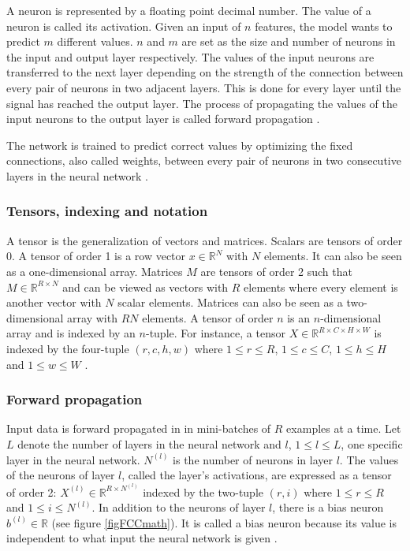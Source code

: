 \documentclass[a4paper, twoside]{article}
\begin{document}
A neuron is represented by a floating point decimal number. The value of a neuron is called its activation. Given an input of $n$ features, the model wants to predict $m$ different values. $n$ and $m$ are set as the size and number of neurons in the input and output layer respectively. The values of the input neurons are transferred to the next layer depending on the strength of the connection between every pair of neurons in two adjacent layers. This is done for every layer until the signal has reached the output layer. The process of propagating the values of the input neurons to the output layer is called forward propagation \cite{cs231n}.

The network is trained to predict correct values by optimizing the fixed connections, also called weights, between every pair of neurons in two consecutive layers in the neural network \cite{cs231n}.

\subsubsection{Tensors, indexing and notation}
A tensor is the generalization of vectors and matrices. Scalars are tensors of order 0. A tensor of order 1 is a row vector $x \in \mathbb{R}^N$ with $N$ elements. It can also be seen as a one-dimensional array. Matrices $M$ are tensors of order 2 such that $M \in \mathbb{R}^{R \times N}$ and can be viewed as vectors with $R$ elements where every element is another vector with $N$ scalar elements. Matrices can also be seen as a two-dimensional array with $RN$ elements. A tensor of order $n$ is an $n$-dimensional array and is indexed by an $n$-tuple. For instance, a tensor $X \in \mathbb{R}^{R \times C \times H \times W}$ is indexed by the four-tuple $(r,c,h,w)$ where $1 \leq r \leq R$, $1 \leq c \leq C$, $1 \leq h \leq H$ and $1 \leq w \leq W$ \cite{cs231n}.

\subsubsection{Forward propagation}
Input data is forward propagated in in mini-batches of $R$ examples at a time. Let $L$ denote the number of layers in the neural network and $l$, $1 \leq l \leq L$, one specific layer in the neural network. $N^{(l)}$ is the number of neurons in layer $l$. The values of the neurons of layer $l$, called the layer's activations, are expressed as a tensor of order 2: $X^{(l)} \in \mathbb{R}^{R \times N^{(l)}}$ indexed by the two-tuple $(r,i)$ where $1 \leq r \leq R$ and $1 \leq i \leq N^{(l)}$. In addition to the neurons of layer $l$, there is a bias neuron $b^{(l)} \in \mathbb{R}$ (see figure \ref{figFCCmath}). It is called a bias neuron because its value is independent to what input the neural network is given \cite{cs231n} \cite{wikiStanford}.
\end{document}
